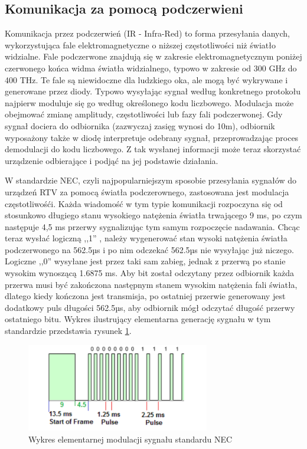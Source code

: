 \documentclass[12pt,twoside,draft]{article}
\begin{document}
\subsection{Komunikacja za pomocą podczerwieni}
Komunikacja przez podczerwień\cite{infrared} (IR - Infra-Red) to forma przesyłania danych, wykorzystująca fale elektromagnetyczne
o niższej częstotliwości niż światło widzialne. Fale podczerwone znajdują się w zakresie elektromagnetycznym
poniżej czerwonego końca widma światła widzialnego, typowo w zakresie od 300 GHz do 400 THz. Te fale są
niewidoczne dla ludzkiego oka, ale mogą być wykrywane i generowane przez diody. Typowo
wysyłając sygnał według konkretnego protokołu najpierw moduluje się go według określonego kodu liczbowego.
Modulacja może obejmować zmianę amplitudy, częstotliwości lub fazy fali podczerwonej. Gdy sygnał dociera do odbiornika
(zazwyczaj zasięg wynosi do 10m), odbiornik wyposażony także w diodę interpretuje odebrany sygnał, przeprowadzając proces demodulacji do kodu
liczbowego. Z tak wysłanej informacji może teraz skorzystać urządzenie odbierające i podjąć na jej podstawie działania.

W standardzie NEC\cite{necIR}, czyli najpopularniejszym sposobie przesyłania sygnałów do urządzeń RTV za pomocą światła podczerownego, zastosowana jest modulacja częstotliwośći. Każda wiadomość w tym typie komunikacji rozpoczyna się od stosunkowo długiego stanu wysokiego natężenia światła trwającego 9 ms, po czym następuje 4,5 ms przerwy sygnalizując tym samym rozpoczęcie nadawania. Chcąc teraz wysłać logiczną ,,1'' , należy wygenerować stan wysoki natężenia światła podczerwonego na 562.5µs i po nim odczekać 562.5µs nie wysyłając już niczego. Logiczne ,,0'' wysyłane jest przez taki sam zabieg, jednak z przerwą po stanie wysokim wynoszącą 1.6875 ms. Aby bit został odczytany przez odbiornik każda przerwa musi być zakończona następnym stanem wysokim natężenia fali światła, dlatego kiedy kończona jest transmisja, po ostatniej przerwie generowany jest dodatkowy puls długości 562.5µs, aby odbiornik mógł odczytać długość przerwy ostatniego bitu. Wykres ilustrujący elementarna generację sygnału w tym standardzie przedstawia rysunek \ref*{Fig:necOnesZerosFigure}.
\begin{figure}[ht]
   \centering
   \includegraphics[width=8cm]{images/necOnesAndZeros.png}
   \caption{Wykres elementarnej modulacji sygnału standardu NEC}
   \label{Fig:necOnesZerosFigure}
\end{figure}
\end{document}
